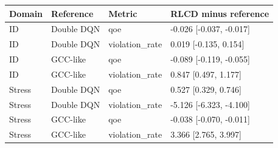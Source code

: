 \begin{tabular}{llll}
\toprule
Domain & Reference & Metric & RLCD minus reference \\
\midrule
ID & Double DQN & qoe & -0.026 [-0.037, -0.017] \\
ID & Double DQN & violation\_rate & 0.019 [-0.135, 0.154] \\
ID & GCC-like & qoe & -0.089 [-0.119, -0.055] \\
ID & GCC-like & violation\_rate & 0.847 [0.497, 1.177] \\
Stress & Double DQN & qoe & 0.527 [0.329, 0.746] \\
Stress & Double DQN & violation\_rate & -5.126 [-6.323, -4.100] \\
Stress & GCC-like & qoe & -0.038 [-0.070, -0.011] \\
Stress & GCC-like & violation\_rate & 3.366 [2.765, 3.997] \\
\bottomrule
\end{tabular}
